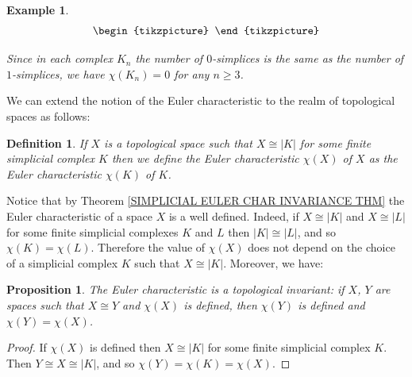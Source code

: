 \documentclass[11pt, letterpaper, oneside]{report}
\theoremstyle{pplain}
\newtheorem{proposition}[theorem]{Proposition}
\newtheorem{ITERMVALUE THM}[theorem]{Intermediate Value Theorem}
\newtheorem{HEINEBOREL THM}[theorem]{Heine-Borel Theorem}
\newtheorem{UMETR THM}[theorem]{Urysohn Metrization Theorem}
\newtheorem{UMETR2 THM}[theorem]{Urysohn Metrization Theorem (v.2)}
\theoremstyle{ddefinition}
\newtheorem{definition}[theorem]{Definition}
\newtheorem{example}[theorem]{Example}
\theoremstyle{nnn}
\newtheorem{TDA NN}[theorem]{Topological Data Analysis. }
\theoremstyle{eexercise}
\begin{document}
\begin{example}
\begin{equation*}
\begin{tikzpicture}
\end{tikzpicture}
\end{equation*}

Since in each complex $K_{n}$ the  number of $0$-simplices is the same as the number of $1$-simplices,  
we have $\chi(K_{n}) = 0$ for any $n\geq 3$. 

\end{example}

We can extend the notion of the Euler characteristic to the realm of topological spaces as follows:

\begin{definition}
If $X$ is a topological space such that $X\cong |K|$ for some finite simplicial complex $K$ then  we define
the Euler characteristic $\chi(X)$ of $X$ as the Euler characteristic $\chi(K)$ of $K$. 
\end{definition}

Notice that by Theorem \ref{SIMPLICIAL EULER CHAR INVARIANCE  THM} 
the Euler characteristic of a space $X$
is a well defined. Indeed, if $X\cong |K|$ and $X\cong |L|$ for some finite simplicial complexes
$K$ and $L$ then $|K|\cong |L|$, and so $\chi(K) = \chi(L)$. Therefore the value of $\chi(X)$ does not depend
on the choice of  a simplicial complex $K$ such that $X\cong |K|$. Moreover, we have:

\begin{proposition}
\label{TOP EULER CHAR INVARIANCE  THM}
The Euler characteristic is a topological invariant: if $X$, $Y$ are spaces such that $X\cong Y$ and 
$\chi(X)$ is defined, then $\chi(Y)$ is defined and $\chi(Y) = \chi(X)$.
\end{proposition}


\begin{proof}
If $\chi(X)$ is defined then $X \cong |K|$ for some finite simplicial complex $K$. Then 
$Y\cong X \cong |K|$, and so $\chi(Y) = \chi(K) = \chi(X)$. 
\end{proof}
\end{document}
